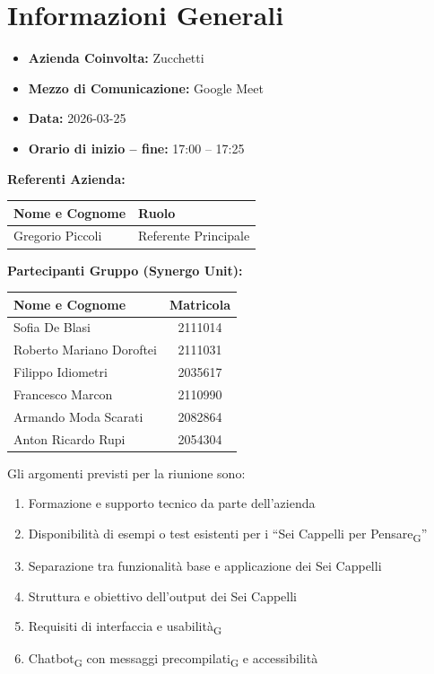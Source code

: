 \section{Informazioni Generali}
\begin{itemize}
	\item \textbf{Azienda Coinvolta:} {Zucchetti}
	\item \textbf{Mezzo di Comunicazione:} {Google Meet}
	\item \textbf{Data:} 2026-03-25
	\item \textbf{Orario di inizio -- fine:} 17:00 -- 17:25
\end{itemize}


\vspace{0.5cm}
\textbf{Referenti Azienda:}
\begin{table}[ht]
	\centering
	\renewcommand{\arraystretch}{1.2}
	\begin{tabularx}{\textwidth}{X l}
		\toprule
		\textbf{Nome e Cognome} & \textbf{Ruolo} \\
		\midrule
		{Gregorio Piccoli} & {Referente Principale} \\
		\bottomrule
	\end{tabularx}
\end{table}

\vspace{0.5cm}
\textbf{Partecipanti Gruppo (Synergo Unit):}
\begin{table}[ht]
	\centering
	\renewcommand{\arraystretch}{1.2}
	\begin{tabularx}{\textwidth}{X c}
		\toprule
		\textbf{Nome e Cognome} & \textbf{Matricola}\\
		\midrule
		Sofia De Blasi & 2111014 \\
		Roberto Mariano Doroftei & 2111031 \\
		Filippo Idiometri & 2035617 \\
		Francesco Marcon & 2110990 \\
		Armando Moda Scarati & 2082864 \\
		Anton Ricardo Rupi & 2054304 \\
		\bottomrule
	\end{tabularx}
\end{table}

Gli argomenti previsti per la riunione sono:
\begin{enumerate}[leftmargin=1.8em, itemsep=3pt]
    \item Formazione e supporto tecnico da parte dell'azienda
    \item Disponibilità di esempi o test esistenti per i ``Sei Cappelli per Pensare\textsubscript{G}''
    \item Separazione tra funzionalità base e applicazione dei Sei Cappelli
    \item Struttura e obiettivo dell'output dei Sei Cappelli
    \item Requisiti di interfaccia e usabilità\textsubscript{G}
    \item Chatbot\textsubscript{G} con messaggi precompilati\textsubscript{G} e accessibilità
\end{enumerate}

